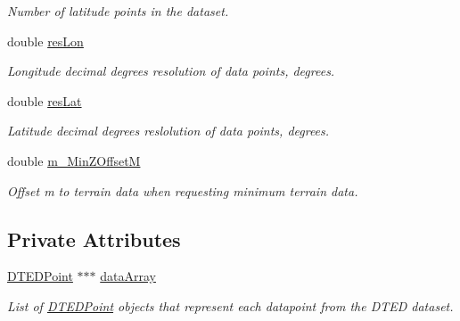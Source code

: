 \begin{DoxyCompactItemize}
\begin{DoxyCompactList}\small\item\em Number of latitude points in the dataset. \end{DoxyCompactList}\item 
\hypertarget{class_d_t_e_d_object_a3b827c8df3b1358b0e1d373ce44d6916}{
double \hyperlink{class_d_t_e_d_object_a3b827c8df3b1358b0e1d373ce44d6916}{resLon}}
\label{class_d_t_e_d_object_a3b827c8df3b1358b0e1d373ce44d6916}

\begin{DoxyCompactList}\small\item\em Longitude decimal degrees resolution of data points, degrees. \end{DoxyCompactList}\item 
\hypertarget{class_d_t_e_d_object_a39397fc0da3a27cadd17233e41a20ca1}{
double \hyperlink{class_d_t_e_d_object_a39397fc0da3a27cadd17233e41a20ca1}{resLat}}
\label{class_d_t_e_d_object_a39397fc0da3a27cadd17233e41a20ca1}

\begin{DoxyCompactList}\small\item\em Latitude decimal degrees reslolution of data points, degrees. \end{DoxyCompactList}\item 
\hypertarget{class_d_t_e_d_object_adcc8b8a480df215cf49b34697feb02be}{
double \hyperlink{class_d_t_e_d_object_adcc8b8a480df215cf49b34697feb02be}{m\_\-MinZOffsetM}}
\label{class_d_t_e_d_object_adcc8b8a480df215cf49b34697feb02be}

\begin{DoxyCompactList}\small\item\em Offset m to terrain data when requesting minimum terrain data. \end{DoxyCompactList}\end{DoxyCompactItemize}
\subsection*{Private Attributes}
\begin{DoxyCompactItemize}
\item 
\hypertarget{class_d_t_e_d_object_a6b7c2c309e1c0a2f78f349499d07a643}{
\hyperlink{class_d_t_e_d_point}{DTEDPoint} $\ast$$\ast$$\ast$ \hyperlink{class_d_t_e_d_object_a6b7c2c309e1c0a2f78f349499d07a643}{dataArray}}
\label{class_d_t_e_d_object_a6b7c2c309e1c0a2f78f349499d07a643}

\begin{DoxyCompactList}\small\item\em List of \hyperlink{class_d_t_e_d_point}{DTEDPoint} objects that represent each datapoint from the DTED dataset. \end{DoxyCompactList}\end{DoxyCompactItemize}
